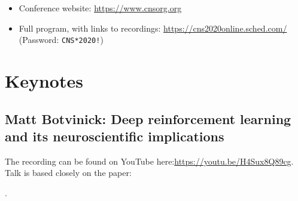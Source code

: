 \documentclass[11pt,a4paper,twoside]{article}
\begin{document}
\maketitle{}

\begin{itemize}
  \item Conference website: \url{https://www.cnsorg.org}
  \item Full program, with links to recordings: \url{https://cns2020online.sched.com/} (Password: \texttt{CNS*2020!})
\end{itemize}

\section{Keynotes}
\subsection{Matt Botvinick: Deep reinforcement learning and its neuroscientific implications}
The recording can be found on YouTube here:\url{https://youtu.be/H4Sux8Q89cg}.
Talk is based closely on the paper:

.
\end{document}
